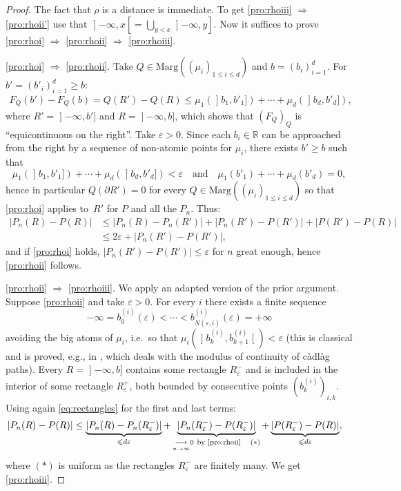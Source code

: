 \documentclass[10pt,a4paper]{article}
\providecommand{\ie}{i.e.\ }
\theoremstyle{plain}
\theoremstyle{definition}
\let\eps\varepsilon
\newcommand{\ma}{\mathrm{Marg}}
\newcommand{\R}{\mathbb{R}}
\newcommand{\AND}{\quad\text{and}\quad}
\newcommand{\op}{\mathopen}
\newcommand{\clo}{\mathclose}
\begin{document}
\begin{proof} The fact that $\rho$ is a distance is immediate. To get \eqref{pro:rhoiii} $\Rightarrow$ \eqref{pro:rhoii'} use that $\op]-\infty,x\clo[=\bigcup_{y<x}\op]-\infty,y]$. Now it suffices to prove \eqref{pro:rhoi} $\Rightarrow$ \eqref{pro:rhoii} $\Rightarrow$ \eqref{pro:rhoiii}.

\eqref{pro:rhoi} $\Rightarrow$ \eqref{pro:rhoii}. Take $Q\in\ma((\mu_i)_{1\leq i\leq d})$ and $b=(b_i)_{i=1}^d$. For $b'=(b'_i)_{i=1}^d\geq b$:
\begin{align}\label{eq:rectangles}
F_Q(b')-F_Q(b)=Q(R')-Q(R)\leq \mu_1(\op]b_1,b'_1])+\cdots+ \mu_d(\op]b_d,b'_d]),
\end{align}
where $R'=\op]-\infty,b']$ and $R=\op]-\infty,b]$, which shows that $(F_Q)_Q$ is ``equicontinuous on the right''. Take $\eps>0$. Since each $b_i\in \R$ can be approached from the right by a sequence of non-atomic points for $\mu_i$, there exists $b'\geqslant b$ such that
\[
\mu_1(\op]b_1,b'_1])+\cdots+ \mu_d(\op]b_d,b'_d])<\eps\AND \mu_1(b'_1)+\cdots+ \mu_d(b'_d)=0,
\]
hence in particular $Q(\partial R')=0$ for every $Q\in \ma((\mu_i)_{1\leq i\leq d})$ so that \eqref{pro:rhoi} applies to~$R'$ for $P$ and all the $P_n$. Thus:\vspace*{-3pt}
\begin{align*}
|P_n(R)- P(R)|&\leq|P_n(R)- P_n(R')|+|P_n(R')-P(R')|+|P(R')- P(R)|\\
&\leq 2\eps+|P_n(R')-P(R')|,
\end{align*}
and if \eqref{pro:rhoi} holds, $|P_n(R')-P(R')|\leqslant\eps$ for $n$ great enough, hence \eqref{pro:rhoii} follows.

\eqref{pro:rhoii} $\Rightarrow$ \eqref{pro:rhoiii}. We apply an adapted version of the prior argument. Suppose \eqref{pro:rhoii} and take $\eps>0$. For every $i$ there exists a finite sequence\vspace*{-3pt}
\[
-\infty=b_0^{(i)}(\eps)<\cdots< b^{(i)}_{N(\eps,i)}(\eps)=+\infty
\]
avoiding the big atoms of $\mu_i$, \ie so that $\mu_i(\op]b_k^{(i)},b_{k+1}^{(i)}\clo[)< \eps$ (this is classical and is proved, e.g., in \cite[\S 12]{Bi}, which deals with the modulus of continuity of càdlàg paths). Every $R=\op]-\infty,b]$ contains some rectangle $R^-_\eps$ and is included in the interior of some rectangle $R^+_\eps$, both bounded by consecutive points $(b^{(i)}_k)_{i,k}$. Using again \eqref{eq:rectangles} for the first and last terms:
\begin{align*}
|P_n(R)- P(R)|&\leq\underbrace{|P_n(R)- P_n(R_\eps^-)|}_{\leqslant d\eps}+\underbrace{|P_n(R_\eps^-)-P(R_\eps^-)|}_{\underset{n\to\infty}\longrightarrow0\ \text{by \eqref{pro:rhoii}}\quad\text{\bf$(\ast)$}}+\underbrace{|P(R_\eps^-)- P(R)|}_{\leqslant d\eps},
\end{align*}
where {\bf$(\ast)$} is uniform as the rectangles $R_\eps^-$ are finitely many. We get \eqref{pro:rhoiii}.
\end{proof}
\end{document}
